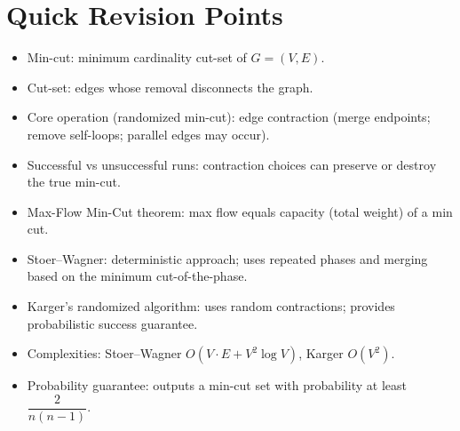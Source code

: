 \documentclass[11pt]{article}
\begin{document}
\section{Quick Revision Points}
\begin{itemize}
\item Min-cut: minimum cardinality cut-set of $G = (V, E)$.
\item Cut-set: edges whose removal disconnects the graph.
\item Core operation (randomized min-cut): edge contraction (merge endpoints; remove self-loops; parallel edges may occur).
\item Successful vs unsuccessful runs: contraction choices can preserve or destroy the true min-cut.
\item Max-Flow Min-Cut theorem: max flow equals capacity (total weight) of a min cut.
\item Stoer--Wagner: deterministic approach; uses repeated phases and merging based on the minimum cut-of-the-phase.
\item Karger’s randomized algorithm: uses random contractions; provides probabilistic success guarantee.
\item Complexities: Stoer--Wagner $O(V \cdot E + V^{2}\log V)$, Karger $O(V^{2})$.
\item Probability guarantee: outputs a min-cut set with probability at least $\dfrac{2}{n(n-1)}$.
\end{itemize}
\end{document}
